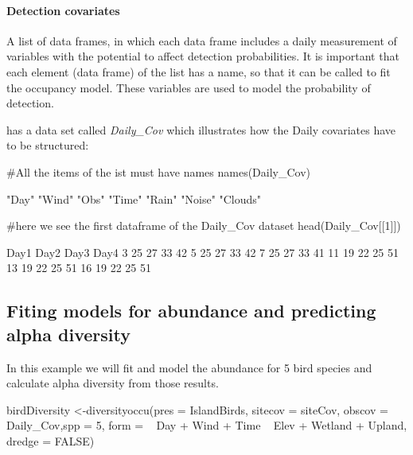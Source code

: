 \documentclass[article]{jss}
\begin{document}
\paragraph{Detection covariates}\label{detection-covariates}

A list of data frames, in which each data frame includes a daily
measurement of variables with the potential to affect detection
probabilities. It is important that each element (data frame) of the
list has a name, so that it can be called to fit the occupancy model.
These variables are used to model the probability of detection.

 has a data set called \emph{Daily\_Cov} which
illustrates how the Daily covariates have to be structured:

\begin{CodeChunk}
\begin{CodeInput}
#All the items of the ist must have names
names(Daily_Cov)
\end{CodeInput}
\begin{CodeOutput}
[1] "Day"    "Wind"   "Obs"    "Time"   "Rain"   "Noise"  "Clouds"
\end{CodeOutput}
\begin{CodeInput}
#here we see the first dataframe of the Daily_Cov dataset
head(Daily_Cov[[1]])
\end{CodeInput}
\begin{CodeOutput}
   Day1 Day2 Day3 Day4
3    25   27   33   42
5    25   27   33   42
7    25   27   33   41
11   19   22   25   51
13   19   22   25   51
16   19   22   25   51
\end{CodeOutput}
\end{CodeChunk}

\subsection{Fiting models for abundance and predicting alpha
diversity}\label{fiting-models-for-abundance-and-predicting-alpha-diversity}

In this example we will fit and model the abundance for 5 bird species
and calculate alpha diversity from those results.

\begin{CodeChunk}
\begin{CodeInput}
birdDiversity <-diversityoccu(pres = IslandBirds, sitecov = siteCov,
obscov = Daily_Cov,spp =  5, form = ~ Day + Wind + Time ~ Elev + Wetland + Upland, dredge = FALSE)
\end{CodeInput}
\end{CodeChunk}
\end{document}

